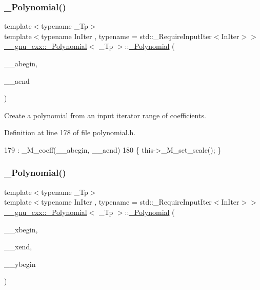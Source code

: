\subsubsection{\texorpdfstring{\+\_\+\+Polynomial()}{\_Polynomial()}\hspace{0.1cm}{\footnotesize\ttfamily [7/9]}}
{\footnotesize\ttfamily template$<$typename \+\_\+\+Tp$>$ \\
template$<$typename In\+Iter , typename  = std\+::\+\_\+\+Require\+Input\+Iter$<$\+In\+Iter$>$$>$ \\
\hyperlink{class____gnu__cxx_1_1__Polynomial}{\+\_\+\+\_\+gnu\+\_\+cxx\+::\+\_\+\+Polynomial}$<$ \+\_\+\+Tp $>$\+::\hyperlink{class____gnu__cxx_1_1__Polynomial}{\+\_\+\+Polynomial} (\begin{DoxyParamCaption}\item[{const In\+Iter \&}]{\+\_\+\+\_\+abegin,  }\item[{const In\+Iter \&}]{\+\_\+\+\_\+aend }\end{DoxyParamCaption})\hspace{0.3cm}{\ttfamily [inline]}}

Create a polynomial from an input iterator range of coefficients. 

Definition at line 178 of file polynomial.\+h.


\begin{DoxyCode}
179         : \_M\_coeff(\_\_abegin, \_\_aend)
180         \{ this->\_M\_set\_scale(); \}
\end{DoxyCode}
\mbox{\label{class____gnu__cxx_1_1__Polynomial_a86249f53e97e72eff11242a8ba85ba4c}} 
\subsubsection{\texorpdfstring{\+\_\+\+Polynomial()}{\_Polynomial()}\hspace{0.1cm}{\footnotesize\ttfamily [8/9]}}
{\footnotesize\ttfamily template$<$typename \+\_\+\+Tp$>$ \\
template$<$typename In\+Iter , typename  = std\+::\+\_\+\+Require\+Input\+Iter$<$\+In\+Iter$>$$>$ \\
\hyperlink{class____gnu__cxx_1_1__Polynomial}{\+\_\+\+\_\+gnu\+\_\+cxx\+::\+\_\+\+Polynomial}$<$ \+\_\+\+Tp $>$\+::\hyperlink{class____gnu__cxx_1_1__Polynomial}{\+\_\+\+Polynomial} (\begin{DoxyParamCaption}\item[{const In\+Iter \&}]{\+\_\+\+\_\+xbegin,  }\item[{const In\+Iter \&}]{\+\_\+\+\_\+xend,  }\item[{const In\+Iter \&}]{\+\_\+\+\_\+ybegin }\end{DoxyParamCaption})\hspace{0.3cm}{\ttfamily [inline]}}

